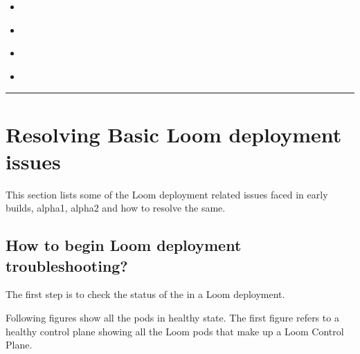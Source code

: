 \documentclass[letterpaper,10pt,english]{sphinxmanual}
\begin{document}
\begin{sphinxShadowBox}
\begin{itemize}
\item {} 
\label{\detokenize{loom_installation_guide:id56}}{\hyperref[\detokenize{loom_installation_guide:moving-to-different-availability-set}]{}}

\item {} 
\label{\detokenize{loom_installation_guide:id57}}{\hyperref[\detokenize{loom_installation_guide:issues-related-to-sluggish-loom-application-response}]{}}

\item {} 
\label{\detokenize{loom_installation_guide:id58}}{\hyperref[\detokenize{loom_installation_guide:issues-related-to-loom-metrics}]{}}

\item {} 
\label{\detokenize{loom_installation_guide:id59}}{\hyperref[\detokenize{loom_installation_guide:issues-related-to-system-load}]{}}

\end{itemize}
\end{sphinxShadowBox}


\bigskip\hrule\bigskip



\section{Resolving Basic Loom deployment issues}
\label{\detokenize{loom_installation_guide:resolving-basic-loom-deployment-issues}}
This section lists some of the Loom deployment related issues faced in early builds, alpha1, alpha2 and how to resolve the same.


\subsection{How to begin Loom deployment troubleshooting?}
\label{\detokenize{loom_installation_guide:how-to-begin-loom-deployment-troubleshooting}}
The first step is to check the status of the  in a Loom deployment.

Following figures show all the pods in healthy state.  The first figure refers to a healthy control plane showing all the Loom pods that make up a Loom Control Plane.
\end{document}
